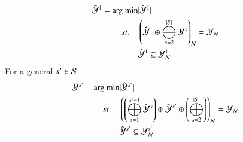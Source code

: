 \begin{enumerate}
\begin{align}
    \bY^1  =  \text{arg min} &\lvert \hY^1 \rvert \\ 
    st. \quad& \left( \hY^1 \+ \msum_{s=2}^{\abs{S}} \Y^s \right)_\mcN = \Yn  \nonumber  \\
	     & \hY^1 \subseteq \Yn^1
\end{align}
For a general $s' \in \S$
\begin{align}
    \bY^{s'} = \text{arg min} &\lvert \hY^{s'} \rvert \\ 
    st. \quad& \left( \left(\msum_{s = 1}^{s'-1} \hY^s \right) \+ \bY^{s'} \+ \left(\msum_{s=2}^{\abs{S}} \right)\right)_\mcN = \Yn  \nonumber  \\
	     & \hY^{s'} \subseteq \Yn^{s'}
\end{align}



\end{enumerate}

